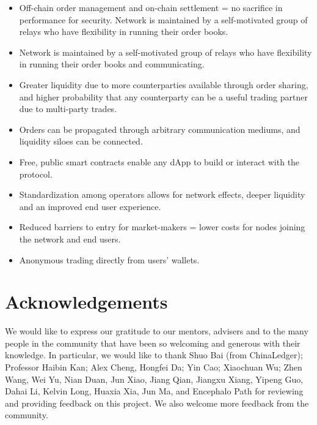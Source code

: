 \documentclass[UTF8,nofonts]{article}
\begin{document}
\begin{multicols}{2}
\begin{itemize}
	\item Off-chain order management and on-chain settlement = no sacrifice in performance for security.
Network is maintained by a self-motivated group of relays who have flexibility in running their order books.
	\item Network is maintained by a self-motivated group of relays who have flexibility in running their order books and communicating.
	\item Greater liquidity due to more counterparties available through order sharing, and higher probability that any counterparty can be a useful trading partner due to multi-party trades.
	\item Orders can be propagated through arbitrary communication mediums, and liquidity siloes can be connected.
	\item Free, public smart contracts enable any dApp to build or interact with the protocol.
	\item Standardization among operators allows for network effects, deeper liquidity and an improved end user experience.
	\item Reduced barriers to entry for market-makers = lower costs for nodes joining the network and end users.
	\item Anonymous trading directly from users’ wallets.
\end{itemize}

\section{Acknowledgements}
We would like to express our gratitude to our mentors, advisers and to the many people in the community that have been so welcoming and generous with their knowledge. In particular, we would like to thank Shuo Bai (from ChinaLedger); Professor Haibin Kan; Alex Cheng, Hongfei Da; Yin Cao; Xiaochuan Wu; Zhen Wang, Wei Yu, Nian Duan, Jun Xiao, Jiang Qian, Jiangxu Xiang, Yipeng Guo, Dahai Li, Kelvin Long, Huaxia Xia, Jun Ma, and Encephalo Path for reviewing and providing feedback on this project. We also welcome more feedback from the community.







\end{multicols}

\newpage
\end{document}

